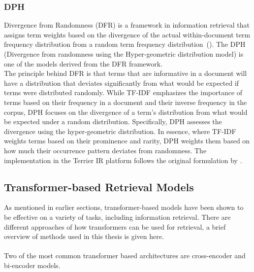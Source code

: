 \subsubsection{DPH}\label{sec:dph}
Divergence from Randomness (DFR) is a framework in information retrieval that assigns term weights based on the divergence of the actual within-document term frequency distribution from a random term frequency distribution~(\cite{amati:2006}).
The DPH (Divergence from randomness using the Hyper-geometric distribution model) is one of the models derived from the DFR framework.
\\
The principle behind DFR is that terms that are informative in a document will have a distribution that deviates significantly from what would be expected if terms were distributed randomly.
While TF-IDF emphasizes the importance of terms based on their frequency in a document and their inverse frequency in the corpus, DPH focuses on the divergence of a term's distribution from what would be expected under a random distribution.
Specifically, DPH assesses the divergence using the hyper-geometric distribution.
In essence, where TF-IDF weights terms based on their prominence and rarity, DPH weights them based on how much their occurrence pattern deviates from randomness.
The implementation in the Terrier IR platform follows the original formulation by \cite{amati:2006}.


\subsection{Transformer-based Retrieval Models}\label{sec:transformer-retrieval-models}
As mentioned in earlier sections, transformer-based models have been shown to be effective on a variety of tasks, including information retrieval.
There are different approaches of how transformers can be used for retrieval, a brief overview of methods used in this thesis is given here.
\\\\
Two of the most common transformer based architectures are cross-encoder and bi-encoder models.


